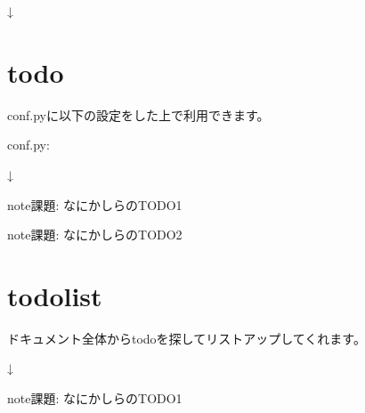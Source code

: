 \documentclass[letterpaper,10pt,dvipdfmx,openany,oneside]{sphinxmanual}
\begin{document}
↓


\section{todo}
\label{\detokenize{2.chapter/directive:todo}}
conf.pyに以下の設定をした上で利用できます。

conf.py:

%
\begin{sphinxVerbatim}[commandchars=\\\{\}]
  \PYG{p}{[}
\PYG{p}{]}

  
\end{sphinxVerbatim}

%
\begin{sphinxVerbatim}[commandchars=\\\{\}]
  


 

\end{sphinxVerbatim}

↓

\begin{sphinxadmonition}{note}{\label{2.chapter/directive:index-0}課題:}
なにかしらのTODO1
\end{sphinxadmonition}

\begin{sphinxadmonition}{note}{\label{2.chapter/directive:index-1}課題:}
なにかしらのTODO2
\end{sphinxadmonition}


\section{todolist}
\label{\detokenize{2.chapter/directive:todolist}}
ドキュメント全体からtodoを探してリストアップしてくれます。

%
\begin{sphinxVerbatim}[commandchars=\\\{\}]
 
\end{sphinxVerbatim}

↓

\begin{sphinxadmonition}{note}{課題:}
なにかしらのTODO1
\end{sphinxadmonition}
\end{document}
